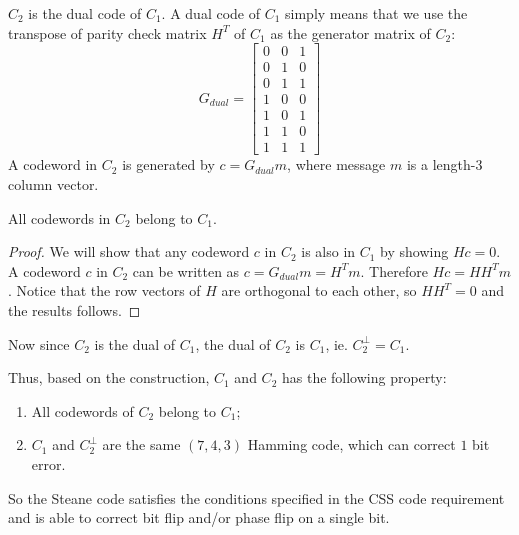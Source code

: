 \(C_2\) is the dual code of \(C_1\). A dual code of \(C_1\) simply means that we use the transpose of parity check matrix \(H^T\) of \(C_1\) as the generator matrix of \(C_2\):
$$G_{dual} = \begin{bmatrix}
    0 & 0 & 1\\
    0 & 1 & 0\\
    0 & 1 & 1\\
    1 & 0 & 0\\
    1 & 0 & 1\\
    1 & 1 & 0\\
    1 & 1 & 1
\end{bmatrix}$$
A codeword in \(C_2\) is generated by \(c = G_{dual} m\), where message \(m\) is a length-3 column vector. 


\begin{lemma}
    All codewords in \(C_2\) belong to \(C_1\). 
\end{lemma}

\begin{proof}
We will show that any codeword \(c\) in \(C_2\) is also in \(C_1\) by showing \(Hc = 0\). A codeword \(c\) in \(C_2\) can be written as \(c = G_{dual} m = H^T m\). Therefore \(Hc = H H^T m\). Notice that the row vectors of \(H\) are orthogonal to each other, so \(H H^T = 0\) and the results follows. 
\end{proof}

Now since \(C_2\) is the dual of \(C_1\), the dual of \(C_2\) is \(C_1\), ie. \(C_2^{\perp} = C_1\).

Thus, based on the construction, \(C_1\) and \(C_2\) has the following property: 

\begin{enumerate}
    \item All codewords of \(C_2\) belong to \(C_1\); 
    \item \(C_1\) and \(C_2^{\perp}\) are the same \((7,4,3)\) Hamming code, which can correct \(1\) bit error.
\end{enumerate}

So the Steane code satisfies the conditions specified in the CSS code requirement and is able to correct bit flip and/or phase flip on a single bit. 

